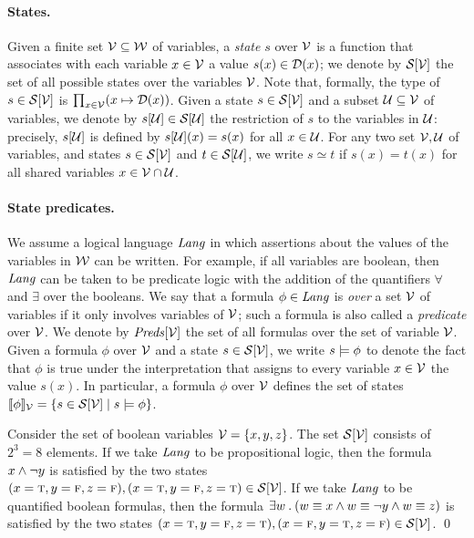 \documentclass[11pt]{report}
\begin{document}
\paragraph{States.}
Given a finite set ${\cal V}\subseteq{\cal W}$ of variables,
a {\em state\/} $s$ over ${\cal V}$ is a function that associates with each
variable $x \in {\cal V}$ a value $s(x) \in {\cal D}(x)$; we
denote by ${\cal S}[{\cal V}]$ the set of all possible states over the
variables ${\cal V}$.
Note that, formally, the type of $s \in {\cal S}[{\cal V}]$ is
$\prod_{x\in{\cal V}} (x \mapsto {\cal D}(x))$.
Given a state $s \in {\cal S}[{\cal V}]$ and a subset ${\cal U} \subseteq {\cal V}$
of variables, we denote by $s[{\cal U}] \in {\cal S}[{\cal U}]$ the
restriction of $s$ to the variables in ${\cal U}$: precisely,
$s[{\cal U}]$ is defined by $s[{\cal U}](x) = s(x)$ for all
$x \in {\cal U}$.
For any two set ${\cal V},{\cal U}$ of variables, and states
$s \in {\cal S}[{\cal V}]$ and $t \in {\cal S}[{\cal U}]$,
we write $s \simeq t$ if $s(x) = t(x)$ for all
shared variables $x \in {\cal V} \cap {\cal U}$.

\paragraph{State predicates.}
We assume a logical language ${\text{\textit{Lang}}}$ in which assertions about the
values of the variables in ${\cal W}$ can be written.
For example, if all variables are boolean, then ${\text{\textit{Lang}}}$ can be
taken to be predicate logic with the addition of the
quantifiers $\forall$ and $\exists$ over the booleans.
We say that a formula $\phi\in{\text{\textit{Lang}}}$ is {\em over\/} a set ${\cal V}$
of variables if it only involves variables of ${\cal V}$; such a formula
is also called a {\em predicate\/} over ${\cal V}$.
We denote by ${\text{\textit{Preds}}}[{\cal V}]$ the set of all formulas over the set of
variable ${\cal V}$.
Given a formula $\phi$ over ${\cal V}$ and a state
$s \in {\cal S}[{\cal V}]$, we write $s \models \phi$ to denote the fact that
$\phi$ is true under the interpretation that assigns to every variable
$x \in {\cal V}$ the value $s(x)$.
In particular, a formula $\phi$ over ${\cal V}$ defines the set of states
$[\![ \phi ]\!]_{\cal V} = \{ s \in {\cal S}[{\cal V}] \mid s \models \phi \}$.

\begin{examp}{}
Consider the set of boolean variables ${\cal V} = \{ x,y,z \}$.
The set ${\cal S}[{\cal V}]$ consists of $2^3 = 8$ elements.
If we take ${\text{\textit{Lang}}}$ to be propositional logic, then the formula
$x \wedge \neg y$ is satisfied by the two states
$(x=\mbox{\sc t},y=\mbox{\sc f},z=\mbox{\sc f}), (x=\mbox{\sc t},y=\mbox{\sc f},z=\mbox{\sc t}) \in {\cal S}[{\cal V}]$.
If we take ${\text{\textit{Lang}}}$ to be quantified boolean formulas, then
the formula
$
  \exists w \:.\: (w \equiv x \wedge w \equiv \neg y \wedge w \equiv z)
$
is satisfied by the two states
$(x=\mbox{\sc t},y=\mbox{\sc f},z=\mbox{\sc t}), (x=\mbox{\sc f},y=\mbox{\sc t},z=\mbox{\sc f}) \in {\cal S}[{\cal V}]$.
\qed
\end{examp}
\end{document}
